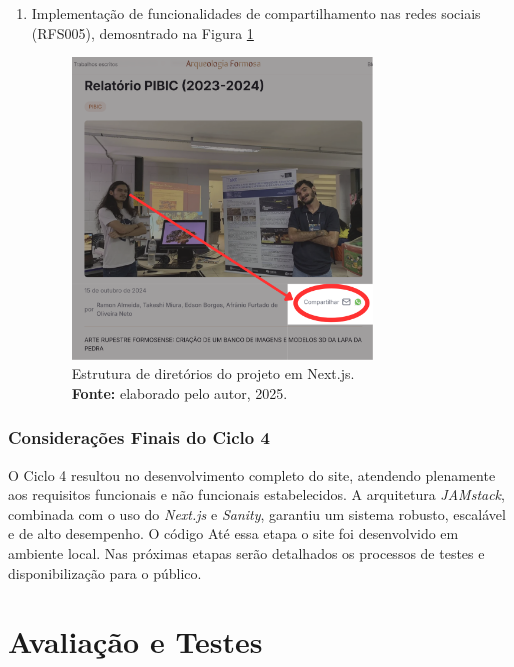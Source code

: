 \begin{enumerate}
\begin{enumerate}
            \item Implementação de funcionalidades de compartilhamento nas redes sociais (RFS005), demosntrado na Figura \ref{fig:redes sociais}
                    \begin{figure}[H]
                        \centering
                        \includegraphics[height=8cm, keepaspectratio]{img/site/redes sociais.png}
                        \caption{ Estrutura de diretórios do projeto em Next.js. \\
                            \textbf{Fonte:} elaborado pelo autor, 2025.}
                        \label{fig:redes sociais}
                    \end{figure}
        \end{enumerate}
    \end{enumerate}
        


\subsubsection*{Considerações Finais do Ciclo 4}
O Ciclo 4 resultou no desenvolvimento completo do site, atendendo plenamente aos requisitos funcionais e não funcionais estabelecidos. A arquitetura \textit{JAMstack}, combinada com o uso do \textit{Next.js} e \textit{Sanity}, garantiu um sistema robusto, escalável e de alto desempenho. O código Até essa etapa o site foi desenvolvido em ambiente local. Nas próximas etapas serão detalhados os processos de testes e disponibilização para o público.





\section{Avaliação e Testes}
\label{sec:avaliacao_testes}

